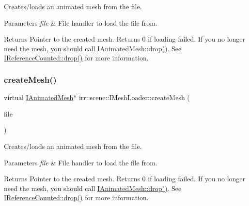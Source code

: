 Creates/loads an animated mesh from the file. 


\begin{DoxyParams}{Parameters}
{\em file} & File handler to load the file from. \\
\hline
\end{DoxyParams}
\begin{DoxyReturn}{Returns}
Pointer to the created mesh. Returns 0 if loading failed. If you no longer need the mesh, you should call \hyperlink{classirr_1_1IReferenceCounted_a03856a09355b89d178090c4a5f738543}{I\+Animated\+Mesh\+::drop()}. See \hyperlink{classirr_1_1IReferenceCounted_a03856a09355b89d178090c4a5f738543}{I\+Reference\+Counted\+::drop()} for more information. 
\end{DoxyReturn}
\mbox{\label{classirr_1_1scene_1_1IMeshLoader_ad09c19dd8c8608f0e49c40102e2aaee1}} 
\subsubsection{\texorpdfstring{create\+Mesh()}{createMesh()}\hspace{0.1cm}{\footnotesize\ttfamily [2/2]}}
{\footnotesize\ttfamily virtual \hyperlink{classirr_1_1scene_1_1IAnimatedMesh}{I\+Animated\+Mesh}$\ast$ irr\+::scene\+::\+I\+Mesh\+Loader\+::create\+Mesh (\begin{DoxyParamCaption}\item[{\hyperlink{classirr_1_1io_1_1IReadFile}{io\+::\+I\+Read\+File} $\ast$}]{file }\end{DoxyParamCaption})\hspace{0.3cm}{\ttfamily [pure virtual]}}



Creates/loads an animated mesh from the file. 


\begin{DoxyParams}{Parameters}
{\em file} & File handler to load the file from. \\
\hline
\end{DoxyParams}
\begin{DoxyReturn}{Returns}
Pointer to the created mesh. Returns 0 if loading failed. If you no longer need the mesh, you should call \hyperlink{classirr_1_1IReferenceCounted_a03856a09355b89d178090c4a5f738543}{I\+Animated\+Mesh\+::drop()}. See \hyperlink{classirr_1_1IReferenceCounted_a03856a09355b89d178090c4a5f738543}{I\+Reference\+Counted\+::drop()} for more information. 
\end{DoxyReturn}
\mbox{\label{classirr_1_1scene_1_1IMeshLoader_a64bd3f1f17b4ff1f0f4f929c850614f3}} 
